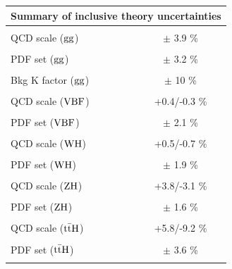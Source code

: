\begin{table}[!htb]
\begin{center}
\small
\begin{tabular}{|lc|}
\hline %
\hline %
\multicolumn{2}{|c|}{\textbf{Summary of inclusive theory uncertainties}} \\
\hline %
\hline %
\vspace{-0.4cm} & \\
QCD scale (${\rm gg}$) & $\pm$ 3.9 \% \\
\vspace{-0.4cm} & \\
PDF set (${\rm gg}$) & $\pm$ 3.2 \% \\
\vspace{-0.4cm} & \\
Bkg K factor (${\rm gg}$) & $\pm$ 10 \% \\
\vspace{-0.4cm} & \\
QCD scale (${\rm VBF}$) & +0.4/-0.3 \% \\
\vspace{-0.4cm} & \\
PDF set (${\rm VBF}$) & $\pm$ 2.1 \% \\
\vspace{-0.4cm} & \\
QCD scale (${\rm WH}$) & +0.5/-0.7 \% \\
\vspace{-0.4cm} & \\
PDF set (${\rm WH}$) & $\pm$ 1.9 \% \\
\vspace{-0.4cm} & \\
QCD scale (${\rm ZH}$) & +3.8/-3.1 \% \\
\vspace{-0.4cm} & \\
PDF set (${\rm ZH}$) & $\pm$ 1.6 \% \\
\vspace{-0.4cm} & \\
QCD scale (${\rm t\bar{t}H}$) & +5.8/-9.2 \% \\
\vspace{-0.4cm} & \\
PDF set (${\rm t\bar{t}H}$) & $\pm$ 3.6 \% \\
\vspace{-0.4cm} & \\

\end{tabular}
\end{center}
\end{table}
